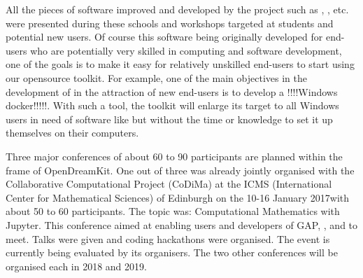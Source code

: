 \documentclass{deliverablereport}
\begin{document}
All the pieces of software improved and developed by the project such as \Sage, \Singular, etc. were presented during these schools and workshops targeted at students and potential new users. Of course this software being originally developed for end-users who are potentially very skilled in computing and software development, one of the goals is to make it easy  for relatively unskilled end-users to start using our opensource toolkit. 
For example, one of the main objectives in the development of \Sage in the attraction of new end-users is to develop a !!!!Windows docker!!!!!. With such a tool, the toolkit will enlarge its target to all Windows users in need of software like \Sage but without the time or knowledge to set it up themselves on their computers.

Three major conferences of about 60 to 90 participants are planned within the frame of OpenDreamKit. One out of three was already jointly organised with the Collaborative Computational Project (CoDiMa) at the ICMS (International Center for Mathematical Sciences) of Edinburgh on the 10-16 January 2017with about 50 to 60 participants. The topic was: Computational Mathematics with Jupyter. This conference aimed at enabling users and developers of GAP, \Singular, \Sage and \Jupyter to meet. Talks were given and coding hackathons were organised. The event is currently being evaluated by its organisers. 
The two other conferences will be organised each in 2018 and 2019.

\end{document}
